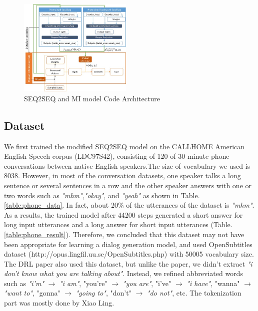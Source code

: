 \documentclass[letterpaper]{article}
\begin{document}
\begin{figure}[bt!]
    \centering
    \includegraphics[width=0.48\textwidth]{mi_architecture} 
    \caption{\small SEQ2SEQ and MI model Code Architecture}
    \label{fig:mi_architecture}
 \end{figure}

\subsection{Dataset}
We first trained the modified SEQ2SEQ model on the CALLHOME American English Speech corpus (LDC97S42), consisting of 120 of 30-minute phone conversations between native English speakers.The size of vocabulary we used is 8038. However, in most of the conversation datasets, one speaker talks a long sentence or several sentences in a row and the other speaker answers with one or two words such as \textit{"mhm"},\textit{"okay"}, and \textit{"yeah"} as shown in Table.\ref{table:phone_data}. In fact, about 20\% of the utterances of the dataset is \textit{"mhm"}. As a results, the trained model after 44200 steps generated a short answer for long input utterances and a long answer for short input utterances (Table.\ref{table:phone_result}). Therefore, we concluded that this dataset may not have been appropriate for learning a dialog generation model, and used OpenSubtitles dataset (http://opus.lingfil.uu.se/OpenSubtitles.php) with 50005 vocabulary size. The DRL paper also used this dataset, but unlike the paper, we didn't extract \textit{"i don't know what you are talking about"}. Instead, we refined abbreviated words such as \textit{"i'm"} $\rightarrow$ \textit{"i am"}, {"you're"} $\rightarrow$ \textit{"you are"}, {"i've"} $\rightarrow$ \textit{"i have"}, {"wanna"} $\rightarrow$ \textit{"want to"}, {"gonna"} $\rightarrow$ \textit{"going to"}, {"don't"} $\rightarrow$ \textit{"do not"}, etc. The tokenization part was mostly done by Xiao Ling.
\end{document}
